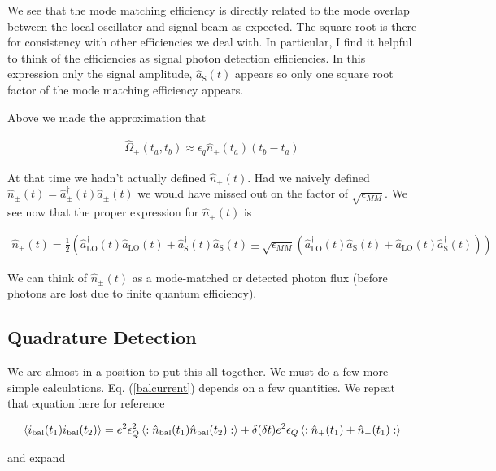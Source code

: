 \documentclass[12pt]{article}
\newcommand{\ep}{\epsilon}
\begin{document}
We see that the mode matching efficiency is directly related to the mode overlap between the local oscillator and signal beam as expected. The square root is there for consistency with other efficiencies we deal with. In particular, I find it helpful to think of the efficiencies as signal photon detection efficiencies. In this expression only the signal amplitude, $\hat{a}_{\text{S}}(t)$ appears so only one square root factor of the mode matching efficiency appears.

Above we made the approximation that 

\begin{align}
\hat{\Omega}_{\pm}(t_a,t_b) \approx \ep_q \hat{n}_{\pm}(t_a)(t_b -t_a)
\end{align}

At that time we hadn't actually defined $\hat{n}_{\pm}(t)$. Had we naively defined $\hat{n}_{\pm}(t) = \hat{a}^{\dag}_{\pm}(t)\hat{a}_{\pm}(t)$ we would have missed out on the factor of $\sqrt{\ep_{MM}}$. We see now that the proper expression for $\hat{n}_{\pm}(t)$ is

\begin{align}
\hat{n}_{\pm}(t) = \frac{1}{2}  \left(\hat{a}^{\dag}_{\text{LO}}(t) \hat{a}_{\text{LO}}(t) + \hat{a}^{\dag}_{\text{S}}(t) \hat{a}_{\text{S}}(t) \pm \sqrt{\ep_{MM}} \left(\hat{a}^{\dag}_{\text{LO}}(t)\hat{a}_{\text{S}}(t) + \hat{a}_{\text{LO}}(t)\hat{a}^{\dag}_{\text{S}}(t) \right)\right)
\end{align}

We can think of $\hat{n}_{\pm}(t)$ as a mode-matched or detected photon flux (before photons are lost due to finite quantum efficiency).

\subsection{Quadrature Detection}

We are almost in a position to put this all together. We must do a few more simple calculations. Eq. (\ref{balcurrent}) depends on a few quantities. We repeat that equation here for reference

\begin{align}
\Braket{i_{\text{bal}}(t_1)i_{\text{bal}}(t_2)} = e^2\ep_Q^2 \Braket{:\hat{n}_{\text{bal}}(t_1) \hat{n}_{\text{bal}}(t_2) :} + \delta(\delta t)e^2\ep_Q \Braket{: \hat{n}_+(t_1) + \hat{n}_-(t_1):}\\
\end{align}

and expand
\end{document}
